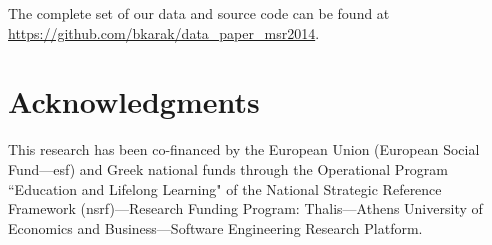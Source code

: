 \documentclass{sig-alternate}
\begin{document}
The complete set of our data and source code can be found at
\url{https://github.com/bkarak/data_paper_msr2014}.

\section{Acknowledgments}
This research has been co-financed by the
European Union (European Social Fund---{\sc esf}) 
and Greek national funds through the Operational
Program ``Education and Lifelong Learning" of the
National Strategic Reference Framework
({\sc nsrf})---Research Funding Program: 
Thalis---Athens University of Economics and
Business---Software Engineering Research Platform.


  
\end{document}
